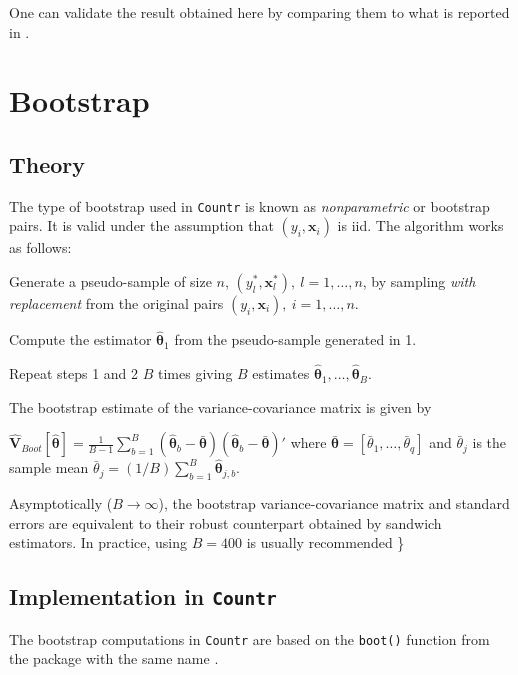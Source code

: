 \documentclass[a4paper,twoside,11pt]{article}
\renewenvironment{enumerate}{\begin{inparaenum}[(i)]}{\end{inparaenum}}
\renewenvironment{enumerate}{\begin{inparaenum}[(a)]}{\end{inparaenum}}
\begin{document}
One can validate the result obtained here by comparing them to what is reported
in \citet[Table 1]{winkelmann1995duration}.

\section{Bootstrap}
\label{sec:org40d0820}
\subsection{Theory}
\label{sec:org8cadc65}

The type of bootstrap used in \texttt{Countr} is known as \emph{nonparametric} or bootstrap
pairs. It is valid under the assumption that \((y_i, \mathbf{x}_i)\) is iid. The
algorithm works as follows:
\begin{enumerate}
\item Generate a pseudo-sample of size \(n\), \((y^*_l, \mathbf{x}^*_l), \ l=1, \dots,
   n\), by sampling \emph{with replacement} from the original pairs \((y_i,
   \mathbf{x}_i), \ i =1, \dots, n\).
\item Compute the estimator \(\hat{\bm{\theta}}_1\) from the pseudo-sample generated
in 1.
\item Repeat steps 1 and 2 \(B\) times giving \(B\) estimates \(\hat{\bm{\theta}}_1,
   \dots, \hat{\bm{\theta}}_B\).
\item The bootstrap estimate of the variance-covariance matrix is given by
\end{enumerate}
\(\hat{\mathbf{V}}_{Boot}[\bm{\hat{\theta}}] = \frac{1}{B -1}
\sum_{b=1}^B(\hat{\bm{\theta}}_b - \bar{\bm{\theta}})(\hat{\bm{\theta}}_b -
\bar{\bm{\theta}})'\) where \(\bar{\bm{\theta}} = [\bar{\theta}_1, \dots,
\bar{\theta}_q]\) and \(\bar{\theta}_j\) is the sample mean \(\bar{\theta}_j = (1/B)
\sum_{b=1}^B \hat{\bm{\theta}}_{j,b}\).

Asymptotically (\(B \rightarrow \infty\)), the bootstrap variance-covariance
matrix and standard errors are equivalent to their robust counterpart obtained
by sandwich estimators. In practice, using \(B=400\) is usually recommended
\citep[Section 2.6.4]{cameron2013regression}\}


\subsection{Implementation in \texttt{Countr}}
\label{sec:org6827d0d}

The bootstrap computations in \texttt{Countr} are based on the \texttt{boot()} function
from the package with the same name \citep{boot2017}.
\end{document}
